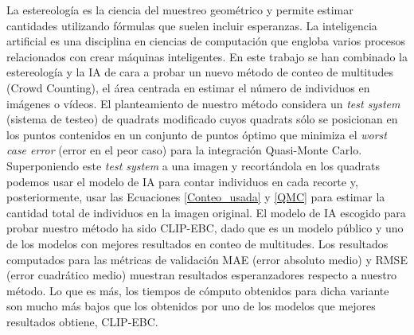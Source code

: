La estereología es la ciencia del muestreo geométrico y permite estimar cantidades utilizando fórmulas que suelen incluir esperanzas. La inteligencia artificial es una disciplina en ciencias de computación que engloba varios procesos relacionados con crear máquinas inteligentes. En este trabajo se han combinado la estereología y la IA de cara a probar un nuevo método de conteo de multitudes (Crowd Counting), el área centrada en estimar el número de individuos en imágenes o vídeos. El planteamiento de nuestro método considera un \textit{test system} (sistema de testeo) de quadrats modificado cuyos quadrats sólo se posicionan en los puntos contenidos en un conjunto de puntos óptimo que minimiza el \textit{worst case error} (error en el peor caso) para la integración Quasi-Monte Carlo. Superponiendo este \textit{test system} a una imagen y recortándola en los quadrats podemos usar el modelo de IA para contar individuos en cada recorte y, posteriormente, usar las Ecuaciones \ref{Conteo_usada} y \ref{QMC} para estimar la cantidad total de individuos en la imagen original. El modelo de IA escogido para probar nuestro método ha sido CLIP-EBC, dado que es un modelo público y uno de los modelos con mejores resultados en conteo de multitudes. Los resultados computados para las métricas de validación MAE (error absoluto medio) y RMSE (error cuadrático medio) muestran resultados esperanzadores respecto a nuestro método. %
Lo que es más, los tiempos de cómputo obtenidos para dicha variante son mucho más bajos que los obtenidos por uno de los modelos que mejores resultados obtiene, CLIP-EBC.\\





